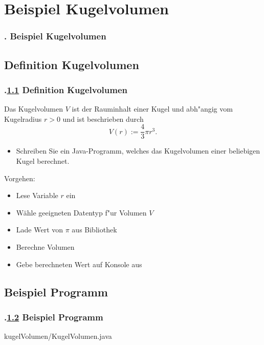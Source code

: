 \AtBeginSection{}
\section{Beispiel Kugelvolumen}
\begin{frame}
  \frametitle{\kap. Beispiel Kugelvolumen}%
\tableofcontents[current]
\end{frame}


\def\stitle{Definition Kugelvolumen}%
\subsection{\stitle}\label{S:BeispielKugelvolumen}
\begin{frame}[t]%
  \frametitle{\kap.\ref{S:BeispielKugelvolumen} \stitle}%
\medskip

Das Kugelvolumen $V$ ist der Rauminhalt einer Kugel und abh"angig vom Kugelradius $r>0$ und ist beschrieben durch
$$ V(r) := \frac{4}{3} \pi r^3. $$
\begin{itemize}
  \item Schreiben Sie ein Java-Programm, welches das Kugelvolumen einer beliebigen Kugel berechnet.
\end{itemize}
\medskip

Vorgehen:
\begin{itemize}
\item Lese Variable $r$ ein
\item W\"ahle geeigneten Datentyp f"ur Volumen $V$
\item Lade Wert von $\pi$ aus Bibliothek
\item Berechne Volumen
\item Gebe berechneten Wert auf Konsole aus
\end{itemize}
\end{frame}


\def\stitle{Beispiel Programm}%
\subsection{\stitle}\label{S:BeispielProgramm}
\begin{frame}[t]%
  \frametitle{\kap.\ref{S:BeispielProgramm} \stitle}%
\medskip


{kugelVolumen/KugelVolumen.java}
\end{frame}


